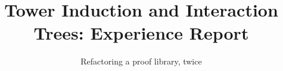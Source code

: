 \documentclass[sigplan,10pt,anonymous,review]{acmart}
\begin{document}
\title{Tower Induction and Interaction Trees: Experience Report}
\subtitle{Refactoring a proof library, twice}

\begin{abstract}

\end{abstract}

\maketitle















\end{document}
